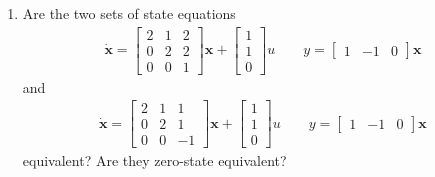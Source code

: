 \documentclass[11pt]{article}
\begin{document}
\begin{enumerate}
	\newpage
	\item{Are the two sets of state equations
		\begin{align*}
			\dot{\mathbf{x}}=\left[\begin{array}{ccc}2 & 1 & 2 \\0 & 2 & 2 \\0 & 0 & 1\end{array}\right]\mathbf{x}+\left[\begin{array}{c}1 \\1 \\0\end{array}\right]u \quad \quad y=\left[\begin{array}{ccc}1 & -1 & 0\end{array}\right]\mathbf{x}
		\end{align*}
	and
		\begin{align*}
			\dot{\mathbf{x}}=\left[\begin{array}{ccc}2 & 1 & 1 \\0 & 2 & 1 \\0 & 0 & -1\end{array}\right]\mathbf{x}+\left[\begin{array}{c}1 \\1 \\0\end{array}\right]u \quad \quad y=\left[\begin{array}{ccc}1 & -1 & 0\end{array}\right]\mathbf{x}
		\end{align*}
	equivalent?  Are they zero-state equivalent?
	\\
	
}
\end{enumerate}
\end{document}

